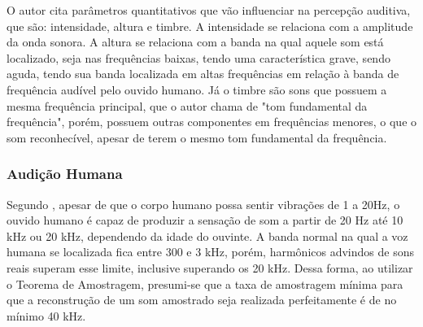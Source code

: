 O autor \cite{moyses} cita parâmetros quantitativos que vão influenciar na percepção auditiva, que são: intensidade, altura e timbre. A intensidade se relaciona com a amplitude da onda sonora. A altura se relaciona com a banda na qual aquele som está localizado, seja nas frequências baixas, tendo uma característica grave, sendo aguda, tendo sua banda localizada em altas frequências em relação à banda de frequência audível pelo ouvido humano. Já o timbre são sons que possuem a mesma frequência principal, que o autor chama de "tom fundamental da frequência", porém, possuem outras componentes em frequências menores, o que o som reconhecível, apesar de terem o mesmo tom fundamental da frequência.

\subsubsection{Audição Humana}
Segundo \cite{farnell}, apesar de que o corpo humano possa sentir vibrações de 1 a 20Hz, o ouvido humano é capaz de produzir a sensação de som a partir de 20 Hz até 10 kHz ou 20 kHz, dependendo da idade do ouvinte. A banda normal na qual a voz humana se localizada fica entre 300 e 3 kHz, porém, harmônicos advindos de sons reais superam esse limite, inclusive superando os 20 kHz.
Dessa forma, ao utilizar o Teorema de Amostragem, presumi-se que a taxa de amostragem mínima para que a reconstrução de um som amostrado seja realizada perfeitamente é de no mínimo 40 kHz. 



